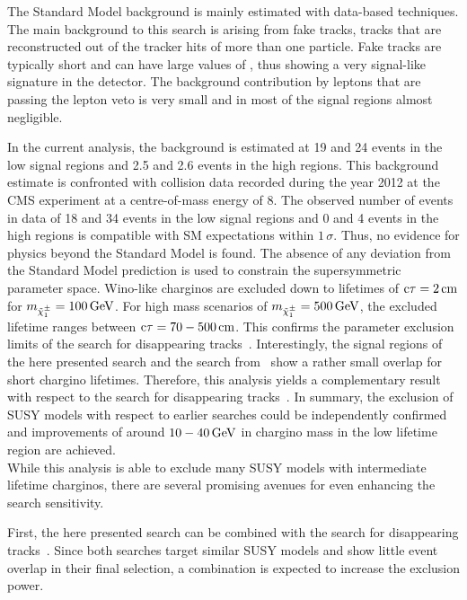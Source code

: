 The Standard Model background is mainly estimated with data-based techniques.
The main background to this search is arising from fake tracks, \ie tracks that are reconstructed out of the tracker hits of more than one particle.
Fake tracks are typically short and can have large values of \ias, thus showing a very signal-like signature in the detector.
The background contribution by leptons that are passing the lepton veto is very small and in most of the signal regions almost negligible.

In the current analysis, the background is estimated at 19 and 24 events in the low \ias signal regions and 2.5 and 2.6 events in the high \ias regions.
This background estimate is confronted with collision data recorded during the year 2012 at the CMS experiment at a centre-of-mass energy of 8\tev.
The observed number of events in data of 18 and 34 events in the low \ias signal regions and 0 and 4 events in the high \ias regions is compatible with SM expectations within $1\,\sigma$.
Thus, no evidence for physics beyond the Standard Model is found. 
The absence of any deviation from the Standard Model prediction is used to constrain the supersymmetric parameter space.
Wino-like charginos are excluded down to lifetimes of $\text{c}\tau=2\,\text{cm}$ for $m_{\tilde{\chi}^{\pm}_{1}}=100\,\text{Ge}\kern-0.06667em\text{V}$.
For high mass scenarios of $m_{\tilde{\chi}^{\pm}_{1}}=500\,\text{Ge}\kern-0.06667em\text{V}$, the excluded lifetime ranges between $\text{c}\tau=70-500\,\text{cm}$.
This confirms the parameter exclusion limits of the search for disappearing tracks~\cite{bib:CMS:DT_8TeV}.
Interestingly, the signal regions of the here presented search and the search from~\cite{bib:CMS:DT_8TeV} show a rather small overlap for short chargino lifetimes.
Therefore, this analysis yields a complementary result with respect to the search for disappearing tracks~\cite{bib:CMS:DT_8TeV}.
In summary, the exclusion of SUSY models with respect to earlier searches could be independently confirmed and improvements of around $10-40\,\text{Ge}\kern-0.06667em\text{V}$ in chargino mass in the low lifetime region are achieved.\\

While this analysis is able to exclude many SUSY models with intermediate lifetime charginos, there are several promising avenues for even enhancing the search sensitivity.

First, the here presented search can be combined with the search for disappearing tracks~\cite{bib:CMS:DT_8TeV}.
Since both searches target similar SUSY models and show little event overlap in their final selection, a combination is expected to increase the exclusion power.


